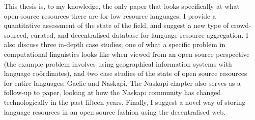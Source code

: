 This thesis is, to my knowledge, the only paper that looks specifically at what open source resources there are for low resource languages. I provide a quantitative assessment of the state of the field, and suggest a new type of crowd-sourced, curated, and decentralised database for language resource aggregation. I also discuss three in-depth case studies; one of what a specific problem in computational linguistics looks like when viewed from an open source perspective (the example problem involves using geographical information systems with language co\"{o}rdinates), and two case studies of the state of open source resources for entire languages: Gaelic and Naskapi. The Naskapi chapter also serves as a follow-up to  paper, looking at how the Naskapi community has changed technologically in the past fifteen years. Finally, I suggest a novel way of storing language resources in an open source fashion using the decentralised web.
